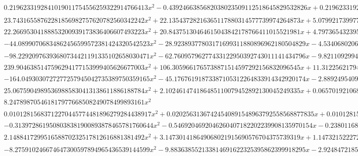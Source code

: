 \documentclass{article}
\begin{document}
\begin{landscape}
\begin{eqnarray*}
\begin{array}{cc}
\begin{array}{cc}
 0.2196233192841019011754556259322914766413 x^2-0.4392466385682038023509112518645829532826 x+0.2196233192841019011754556259322914766413 & \left(x\geq \frac{7}{8}\land x<\frac{15}{16}\right)\lor \left(x\geq \frac{15}{16}\land x<1\right) \\
 23.74316558762281856982757620782560342242 x^2+22.13543728216365117880314577739974264873 x+5.079921739977467338356451106523482406731 & x\geq -\frac{1}{2}\land x<-\frac{7}{16} \\
 22.26695304188853200939173836406607493223 x^2+20.84375130464615043842178766411015521981 x+4.797365432395514051398029019241385156654 & x\geq -\frac{7}{16}\land x<-\frac{3}{8} \\
 -44.08990706834862456599572381424320542523 x^2-28.92389377803171699311880896962180504829 x-4.534068020606586092015832849583357393614 & x\geq -\frac{3}{8}\land x<-\frac{5}{16} \\
 -98.22920976393680734421191335102658030471 x^2-62.76095796277433122950392743011141434796 x-9.821109299472619566451007609034858846687 & x\geq -\frac{5}{16}\land x<-\frac{1}{4} \\
 239.9046385147596294177153999405626677003 x^2+106.3059661765738871514597292156832096545 x+11.31225621794590773116944947168946915363 & x\geq -\frac{1}{4}\land x<-\frac{3}{16} \\
 -164.0493030727277257945042735389750359165 x^2-45.17676191873387105312264833914342920174 x-2.889249540989194600510148424075528239150 & x\geq -\frac{3}{16}\land x<-\frac{1}{8} \\
 25.06759049895369885830413138611886188784 x^2+2.102461474186485110079452892130045249335 x+0.06570192106832765968998290287906391404172 & x\geq -\frac{1}{8}\land x<-\frac{1}{16} \\
 8.247898705461817977668508249078499893161 x^2 & x\geq -\frac{1}{16}\land x<0 \\
 0.01012815683712270445774481896279284438917 x^2+0.02025631367424540891548963792558568877835 x+0.01012815683712270445774481896279284438917 & x\geq -1\land x<-\frac{7}{8} \\
 -0.3139728619508038381900893878465781760644 x^2-0.5469204692046260407182202239908135970154 x-0.2380116856723835547570032456256318431456 & x\geq -\frac{7}{8}\land x<-\frac{3}{4} \\
 2.148841729951658870232517812616881381492 x^2+3.147301418649068021915690576704375739319 x+1.147321522272751718730713304635064157980 & x\geq -\frac{3}{4}\land x<-\frac{5}{8} \\
 -8.275910246674647300597894965436539144599 x^2-9.883638552133814691622325395862399918295 x-2.924847218596899129249916686792053235024 & x\geq -\frac{5}{8}\land x<-\frac{1}{2}
\end{array}


\end{array}
\end{eqnarray*}
\end{landscape}
\end{document}
